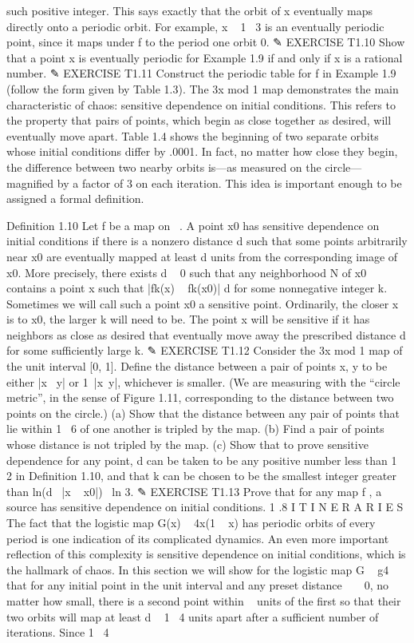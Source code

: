 \documentclass{article}
\begin{document}
such positive integer. This says exactly that the orbit of x eventually maps directly
onto a periodic orbit. For example, x   1  3 is an eventually periodic point, since
it maps under f to the period one orbit 0.
✎ EXERCISE T1.10
Show that a point x is eventually periodic for Example 1.9 if and only if x is
a rational number.
✎ EXERCISE T1.11
Construct the periodic table for f in Example 1.9 (follow the form given by
Table 1.3).
The 3x mod 1 map demonstrates the main characteristic of chaos: sensitive
dependence on initial conditions. This refers to the property that pairs of points,
which begin as close together as desired, will eventually move apart. Table 1.4
shows the beginning of two separate orbits whose initial conditions differ by .0001.
In fact, no matter how close they begin, the difference between two nearby orbits
is—as measured on the circle—magnified by a factor of 3 on each iteration. This
idea is important enough to be assigned a formal definition.

Definition 1.10 Let f be a map on  . A point x0 has sensitive dependence
on initial conditions if there is a nonzero distance d such that some points
arbitrarily near x0 are eventually mapped at least d units from the corresponding
image of x0. More precisely, there exists d   0 such that any neighborhood N of
x0 contains a point x such that |fk(x)   fk(x0)| 
 d for some nonnegative integer
k. Sometimes we will call such a point x0 a sensitive point.
Ordinarily, the closer x is to x0, the larger k will need to be. The point x will
be sensitive if it has neighbors as close as desired that eventually move away the
prescribed distance d for some sufficiently large k.
✎ EXERCISE T1.12
Consider the 3x mod 1 map of the unit interval [0, 1]. Define the distance
between a pair of points x, y to be either |x  y| or 1 |x y|, whichever is
smaller. (We are measuring with the “circle metric”, in the sense of Figure
1.11, corresponding to the distance between two points on the circle.)
(a) Show that the distance between any pair of points that lie within
1  6 of one another is tripled by the map. (b) Find a pair of points whose
distance is not tripled by the map. (c) Show that to prove sensitive dependence
for any point, d can be taken to be any positive number less than
1  2 in Definition 1.10, and that k can be chosen to be the smallest integer
greater than ln(d  |x   x0|)  ln 3.
✎ EXERCISE T1.13
Prove that for any map f , a source has sensitive dependence on initial
conditions.
1 .8 I T I N E R A R I E S
The fact that the logistic map G(x)   4x(1   x) has periodic orbits of every
period is one indication of its complicated dynamics. An even more important
reflection of this complexity is sensitive dependence on initial conditions, which
is the hallmark of chaos.
In this section we will show for the logistic map G   g4 that for any initial
point in the unit interval and any preset distance     0, no matter how small,
there is a second point within   units of the first so that their two orbits will
map at least d   1  4 units apart after a sufficient number of iterations. Since 1  4
\end{document}
